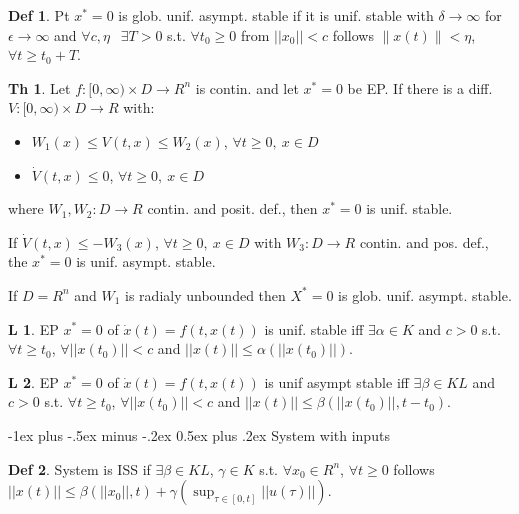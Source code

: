 \documentclass[9pt,landscape]{article}
\makeatletter
\theoremstyle{definition}
\newtheorem*{Theorem}{Th}
\newtheorem*{Lemma}{L}
\newtheorem*{Definition}{Def}
\renewcommand{\section}{\@startsection{section}{1}{0mm}%
                                {-1ex plus -.5ex minus -.2ex}%
                                {0.5ex plus .2ex}%
                                {\normalfont\large\bfseries}}
\makeatother
\begin{document}
\begin{multicols}{4}
\begin{Definition}
 Pt $x^*=0$ is glob. unif. asympt. stable if it is unif. stable
 with $\delta \to \infty$ for $\epsilon \to \infty$ and $\forall c,\eta\ \ $ 
 $\exists T>0$ s.t. $\forall t_0\ge0$ from $||x_0||<c$ follows 
 $\|x(t)\|<\eta$, $\forall t \ge t_0 + T$.
\end{Definition}

\begin{Theorem}
 Let $f:[0,\infty)\times D\to R^n$ is contin. and let $x^*=0$ be EP.
 If there is a diff. $V:[0,\infty)\times D\to R$ with:
 \begin{itemize}
  \item $W_1(x) \le V(t,x) \le W_2(x)$, $\forall t\ge0,\ x\in D$
  \item $\dot V(t,x)\le 0$, $\forall t \ge0,\ x\in D$
 \end{itemize}
 where $W_1,W_2:D \to R$ contin. and posit. def., then $x^*=0$ is unif. stable.

 If $\dot V(t,x) \le -W_3(x)$, $\forall t\ge0,\ x\in D$ with $W_3:D \to R$
 contin. and pos. def., the $x^*=0$ is unif. asympt. stable.

 If $D=R^n$ and $W_1$ is radialy unbounded then $X^*=0$ is glob. unif.
 asympt. stable.
\end{Theorem}

\begin{Lemma}
 EP $x^*=0$ of $\dot x(t)=f(t,x(t))$ is unif. stable iff
 $\exists \alpha\in K$ and $c>0$ s.t.  $\forall t \ge t_0$,
 $\forall ||x(t_0)||<c$ and $||x(t)|| \le \alpha(||x(t_0)||).$ 
\end{Lemma}

\begin{Lemma}
 EP $x^*=0$ of $\dot x(t)=f(t,x(t))$ is unif asympt stable iff
 $\exists \beta\in KL$ and $c>0$ s.t. $\forall t \ge t_0$,
 $\forall ||x(t_0)||<c$ and $||x(t)|| \le \beta(||x(t_0)||, t-t_0).$ 
\end{Lemma}

\section{System with inputs}

\begin{Definition}
 System is ISS if $\exists \beta\in KL$,
 $\gamma\in K$ s.t. $\forall x_0\in R^n$, $\forall t \ge 0$ follows 
 $||x(t)||\le\beta(||x_0||, t)+\gamma(\sup_{\tau\in[0,t]} ||u(\tau)||)$.
\end{Definition}


\end{multicols}
\end{document}
